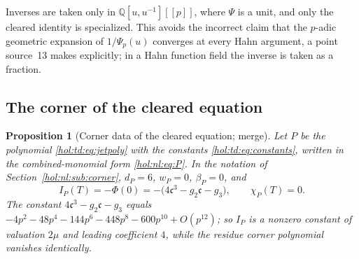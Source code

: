 \documentclass[11pt]{article}
\numberwithin{equation}{section}
\newtheorem{proposition}[theorem]{Proposition}
\theoremstyle{definition}
\theoremstyle{remark}
\newcommand{\Q}{\mathbb Q}
\begin{document}
Inverses are taken only in $\Q[u,u^{-1}][[p]]$, where $\Psi$ is a unit, and
only the cleared identity is specialized. This avoids the incorrect claim that
the $p$-adic geometric expansion of $1/\Psi_p(u)$ converges at every Hahn
argument, a point source~13 makes explicitly; in a Hahn function field the
inverse is taken as a fraction.

\subsection{The corner of the cleared equation}\label{hol:td:sub:corner}

\begin{proposition}[Corner data of the cleared equation; merge]
\label{hol:td:prop:corner}
Let $P$ be the polynomial \eqref{hol:td:eq:jetpoly} with the constants
\eqref{hol:td:eq:constants}, written in the combined-monomial form
\eqref{hol:nl:eq:P}. In the notation of Section~\ref{hol:nl:sub:corner},
$d_P=6$, $w_P=0$, $\beta_P=0$, and
\[
 I_P(T)=-\Phi(0)=-\bigl(4\mathfrak c^3-g_2\mathfrak c-g_3\bigr),\qquad
 \chi_P(T)=0 .
\]
The constant $4\mathfrak c^3-g_2\mathfrak c-g_3$ equals
$-4p^2-48p^4-144p^6-448p^8-600p^{10}+O(p^{12})$; so $I_P$ is a nonzero
constant of valuation $2\mu$ and leading coefficient $4$, while the residue
corner polynomial vanishes identically.
\end{proposition}
\end{document}
